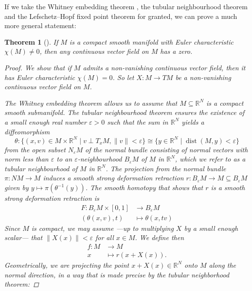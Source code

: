 \documentclass[A4paper, 12pt, british, reqno]{amsart}
\newcommand{\R}{\mathbb{R}} %
\theoremstyle{plain}
\newtheorem{thm}{Theorem}[section]
\theoremstyle{definition}
\theoremstyle{remark}
\theoremstyle{plain}
\theoremstyle{definition}
\theoremstyle{remark}
\theoremstyle{plain}
\theoremstyle{definition}
\theoremstyle{remark}
\begin{document}
{\color{gray}
If we take the Whitney embedding theorem \cite[Theorem II.10.7]{bre93}, the tubular neighbourhood theorem \cite[Theorem II.11.4]{bre93} and the Lefschetz--Hopf fixed point theorem \cite[Theorem IV.23.4]{bre93} for granted, we can prove a much more general statement:

\begin{thm}[{\cite[Corollary IV.23.6]{bre93}}]
    If $M$ is a compact smooth manifold with Euler characteristic $\chi(M)\neq 0$, then any continuous vector field on $M$ has a zero.
    \begin{proof}
	We show that if $M$ admits a non-vanishing continuous vector field, then it has Euler characteristic $\chi(M)=0$.
	So let $X\colon M\to TM$ be a non-vanishing continuous vector field on $M$.

	The Whitney embedding theorem \cite[Theorem II.10.7]{bre93} allows us to assume that $M\subseteq \R^{N}$ is a compact smooth submanifold.
	The tubular neighbourhood theorem \cite[Theorem II.11.4]{bre93} ensures the existence of a small enough real number $\varepsilon >0$ such that the sum in $\R^{N}$ yields a diffeomorphism
	\[ \theta\colon \{ (x,v)\in M\times \R^{N}\mid v\perp T_{x}M, \lVert v \rVert<\varepsilon \} \cong \{ y\in \R^{N}\mid \operatorname{dist}(M,y)<\varepsilon\} \]
	from the open subset $N_{\varepsilon}M$ of the normal bundle consisting of normal vectors with norm less than $\varepsilon$ to an $\varepsilon$-neighbourhood $B_{\varepsilon}M$ of $M$ in $\R^{N}$, which we refer to as a \textit{tubular neighbourhood} of $M$ in $\R^{N}$.
	The projection from the normal bundle $\pi\colon NM\to M$ induces a smooth strong deformation retraction $r\colon B_{\varepsilon}M\to M\subseteq B_{\varepsilon}M$ given by $y\mapsto \pi(\theta^{-1}(y))$.
	The smooth homotopy that shows that $r$ is a smooth strong deformation retraction \cite[Definition I.14.8]{bre93} is
	\begin{align*}
	    F\colon B_{\varepsilon}M\times [0,1] & \longrightarrow B_{\varepsilon}M \\
	    (\theta(x,v),t) & \longmapsto \theta(x,tv)
	\end{align*}
	Since $M$ is compact, we may assume ---up to multiplying $X$ by a small enough scalar--- that $\lVert X(x) \rVert<\varepsilon$ for all $x\in M$.
	We define then
	\begin{align*}
	    f\colon M &\longrightarrow M\\
	    x &\longmapsto r(x+X(x)).
	\end{align*}
	Geometrically, we are projecting the point $x+X(x)\in \R^{N}$ onto $M$ along the normal direction, in a way that is made precise by the tubular neighborhood theorem:


\end{proof}
\end{thm}}
\end{document}
